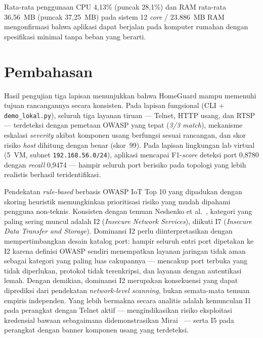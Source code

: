 \documentclass[conference]{IEEEtran}
\begin{document}
Rata-rata penggunaan CPU 4,13\% (puncak 28,1\%) dan RAM rata-rata
36,56~MB (puncak 37,25~MB) pada sistem 12 \textit{core} / 23.886~MB RAM
mengonfirmasi bahwa aplikasi dapat berjalan pada komputer rumahan dengan
spesifikasi minimal tanpa beban yang berarti.

\section{Pembahasan}

Hasil pengujian tiga lapisan menunjukkan bahwa HomeGuard mampu
memenuhi tujuan rancangannya secara konsisten. Pada lapisan fungsional
(CLI + \texttt{demo\_lokal.py}), seluruh tiga layanan tiruan --- Telnet,
HTTP usang, dan RTSP --- terdeteksi dengan pemetaan OWASP yang tepat
(\textit{3/3 match}), mekanisme eskalasi \textit{severity} akibat komponen
usang berfungsi sesuai rancangan, dan skor risiko \textit{host} dihitung
dengan benar (skor~99). Pada lapisan lingkungan lab virtual (5~VM, subnet
\texttt{192.168.56.0/24}), aplikasi mencapai F1-\textit{score} deteksi
port 0,8780 dengan \textit{recall} 0,9474 --- hampir seluruh port berisiko
pada topologi yang lebih realistis berhasil teridentifikasi.

Pendekatan \textit{rule-based} berbasis OWASP IoT Top 10 yang dipadukan
dengan skoring heuristik memungkinkan prioritisasi risiko yang mudah
dipahami pengguna non-teknis. Konsisten dengan temuan Neshenko
et al.\ \cite{neshenko2019}, kategori yang paling sering muncul adalah I2
(\textit{Insecure Network Services}), diikuti I7 (\textit{Insecure Data
Transfer and Storage}). Dominansi I2 perlu diinterpretasikan dengan
mempertimbangkan desain katalog port: hampir seluruh entri port dipetakan
ke I2 karena definisi OWASP sendiri menempatkan layanan jaringan tidak
aman sebagai kategori yang paling luas cakupannya --- mencakup port
terbuka yang tidak diperlukan, protokol tidak terenkripsi, dan layanan
dengan autentikasi lemah. Dengan demikian, dominansi I2 merupakan
konsekuensi yang dapat diprediksi dari pendekatan \textit{network-level
scanning}, bukan semata-mata temuan empiris independen. Yang lebih
bermakna secara analitis adalah kemunculan I1 pada perangkat dengan
Telnet aktif --- mengindikasikan risiko eksploitasi kredensial bawaan
sebagaimana didemonstrasikan Mirai~\cite{antonakakis2017} --- serta I5
pada perangkat dengan banner komponen usang yang terdeteksi.
\end{document}

